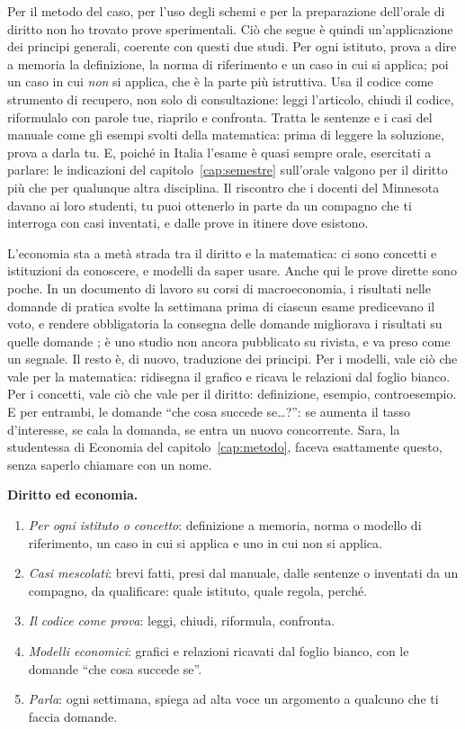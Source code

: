 Per il metodo del caso, per l'uso degli schemi e per la preparazione
dell'orale di diritto non ho trovato prove sperimentali. Ciò che segue
è quindi un'applicazione dei principi generali, coerente con questi
due studi. Per ogni istituto, prova a dire a memoria la definizione,
la norma di riferimento e un caso in cui si applica; poi un caso in cui
\emph{non} si applica, che è la parte più istruttiva. Usa il codice come
strumento di recupero, non solo di consultazione: leggi l'articolo,
chiudi il codice, riformulalo con parole tue, riaprilo e confronta.
Tratta le sentenze e i casi del manuale come gli esempi svolti della
matematica: prima di leggere la soluzione, prova a darla tu. E,
poiché in Italia l'esame è quasi sempre orale, esercitati a parlare:
le indicazioni del capitolo~\ref{cap:semestre} sull'orale valgono per
il diritto più che per qualunque altra disciplina. Il riscontro che i
docenti del Minnesota davano ai loro studenti, tu puoi ottenerlo in
parte da un compagno che ti interroga con casi inventati, e dalle prove
in itinere dove esistono.

L'economia sta a metà strada tra il diritto e la matematica: ci sono
concetti e istituzioni da conoscere, e modelli da saper usare. Anche
qui le prove dirette sono poche. In un documento di lavoro su corsi di
macroeconomia, i risultati nelle domande di pratica svolte la settimana
prima di ciascun esame predicevano il voto, e rendere obbligatoria la
consegna delle domande migliorava i risultati su quelle domande
\parencite{mansour2025}; è uno studio non ancora pubblicato su rivista,
e va preso come un segnale. Il resto è, di nuovo, traduzione dei
principi. Per i modelli, vale ciò che vale per la matematica: ridisegna
il grafico e ricava le relazioni dal foglio bianco. Per i concetti,
vale ciò che vale per il diritto: definizione, esempio, controesempio.
E per entrambi, le domande \enquote{che cosa succede se\dots?}: se
aumenta il tasso d'interesse, se cala la domanda, se entra un nuovo
concorrente. Sara, la studentessa di Economia del
capitolo~\ref{cap:metodo}, faceva esattamente questo, senza saperlo
chiamare con un nome.

\begin{inpratica}
\textbf{Diritto ed economia.}
\begin{enumerate}
  \item \emph{Per ogni istituto o concetto}: definizione a memoria,
        norma o modello di riferimento, un caso in cui si applica e uno
        in cui non si applica.
  \item \emph{Casi mescolati}: brevi fatti, presi dal manuale, dalle
        sentenze o inventati da un compagno, da qualificare: quale
        istituto, quale regola, perché.
  \item \emph{Il codice come prova}: leggi, chiudi, riformula, confronta.
  \item \emph{Modelli economici}: grafici e relazioni ricavati dal
        foglio bianco, con le domande \enquote{che cosa succede se}.
  \item \emph{Parla}: ogni settimana, spiega ad alta voce un argomento a
        qualcuno che ti faccia domande.
\end{enumerate}
\end{inpratica}

